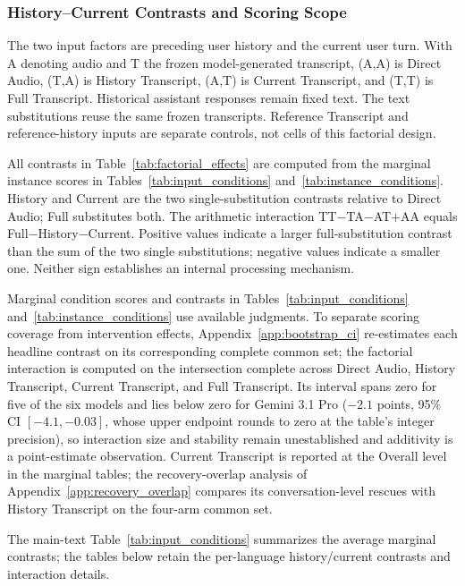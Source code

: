 \subsubsection{History--Current Contrasts and Scoring Scope}

\label{app:factorial_details}

The two input factors are preceding user history and the current user turn. With A denoting audio and T the frozen model-generated transcript, (A,A) is Direct Audio, (T,A) is History Transcript, (A,T) is Current Transcript, and (T,T) is Full Transcript. Historical assistant responses remain fixed text. The text substitutions reuse the same frozen transcripts. Reference Transcript and reference-history inputs are separate controls, not cells of this factorial design.

All contrasts in Table~\ref{tab:factorial_effects} are computed from the marginal instance scores in Tables~\ref{tab:input_conditions} and~\ref{tab:instance_conditions}. History and Current are the two single-substitution contrasts relative to Direct Audio; Full substitutes both. The arithmetic interaction TT$-$TA$-$AT$+$AA equals Full$-$History$-$Current. Positive values indicate a larger full-substitution contrast than the sum of the two single substitutions; negative values indicate a smaller one. Neither sign establishes an internal processing mechanism.

Marginal condition scores and contrasts in Tables~\ref{tab:input_conditions} and~\ref{tab:instance_conditions} use available judgments. To separate scoring coverage from intervention effects, Appendix~\ref{app:bootstrap_ci} re-estimates each headline contrast on its corresponding complete common set; the factorial interaction is computed on the intersection complete across Direct Audio, History Transcript, Current Transcript, and Full Transcript. Its interval spans zero for five of the six models and lies below zero for Gemini 3.1 Pro ($-2.1$ points, 95\% CI $[-4.1, -0.03]$, whose upper endpoint rounds to zero at the table's integer precision), so interaction size and stability remain unestablished and additivity is a point-estimate observation. Current Transcript is reported at the Overall level in the marginal tables; the recovery-overlap analysis of Appendix~\ref{app:recovery_overlap} compares its conversation-level rescues with History Transcript on the four-arm common set.



The main-text Table~\ref{tab:input_conditions} summarizes the average marginal contrasts; the tables below retain the per-language history/current contrasts and interaction details.

